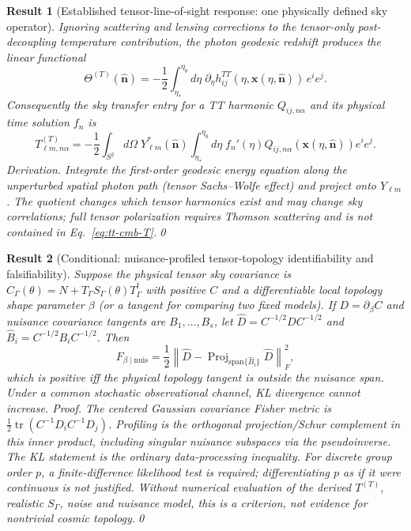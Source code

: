 \documentclass[aps,prd,onecolumn,notitlepage,groupedaddress,11pt]{revtex4-2}
\newtheorem{result}{Result}
\begin{document}
\begin{result}[\textsf{Established tensor-line-of-sight response}: one physically defined sky operator]\label{new:205}
Ignoring scattering and lensing corrections to the \emph{tensor-only} post-decoupling temperature contribution, the photon geodesic redshift produces the linear functional
\begin{equation}\label{eq:tt-cmb-los}
 \Theta^{(T)}(\hat{\boldsymbol n})=-\frac12\int_{\eta_*}^{\eta_0}\!d\eta\;\partial_\eta h^{TT}_{ij}(\eta,\boldsymbol x(\eta,\hat{\boldsymbol n}))\,e^ie^j.
\end{equation}
Consequently the sky transfer entry for a TT harmonic $Q_{ij,n\alpha}$ and its physical time solution $f_n$ is
\begin{equation}\label{eq:tt-cmb-T}
 T_{\ell m,n\alpha}^{(T)}=-\frac12\int_{S^2}d\Omega\;Y_{\ell m}^*(\hat{\boldsymbol n})\int_{\eta_*}^{\eta_0}d\eta\;f_n'(\eta)Q_{ij,n\alpha}(\boldsymbol x(\eta,\hat{\boldsymbol n}))e^ie^j.
\end{equation}
\textit{Derivation.} Integrate the first-order geodesic energy equation along the unperturbed spatial photon path (tensor Sachs--Wolfe effect) and project onto $Y_{\ell m}$. The quotient changes which tensor harmonics exist and may change sky correlations; full tensor polarization requires Thomson scattering and is \emph{not} contained in Eq.~\eqref{eq:tt-cmb-T}.\qed
\end{result}

\begin{result}[\textsf{Conditional}: nuisance-profiled tensor-topology identifiability and falsifiability]\label{new:206}
Suppose the physical tensor sky covariance is $C_\Gamma(\theta)=N+T_\Gamma S_\Gamma(\theta)T_\Gamma^\dagger$ with positive $C$ and a differentiable local topology shape parameter $\beta$ (or a tangent for comparing two fixed models). If $D=\partial_\beta C$ and nuisance covariance tangents are $B_1,\ldots,B_s$, let $\widehat D=C^{-1/2}DC^{-1/2}$ and $\widehat B_i=C^{-1/2}B_iC^{-1/2}$. Then
\begin{equation}\label{eq:tt-fisher-profile}
 F_{\beta\mid\mathrm{nuis}}=\frac12\left\|\widehat D-\operatorname{Proj}_{\mathrm{span}\{\widehat B_i\}}\widehat D\right\|_F^2,
\end{equation}
which is positive iff the physical topology tangent is outside the nuisance span. Under a common stochastic observational channel, KL divergence cannot increase. \textit{Proof.} The centered Gaussian covariance Fisher metric is $\frac12\operatorname{tr}(C^{-1}D_iC^{-1}D_j)$. Profiling is the orthogonal projection/Schur complement in this inner product, including singular nuisance subspaces via the pseudoinverse. The KL statement is the ordinary data-processing inequality. For discrete group order $p$, a \emph{finite-difference likelihood test} is required; differentiating $p$ as if it were continuous is not justified. Without numerical evaluation of the derived $T^{(T)}$, realistic $S_\Gamma$, noise and nuisance model, this is a \emph{criterion}, not evidence for nontrivial cosmic topology.\qed
\end{result}
\end{document}
